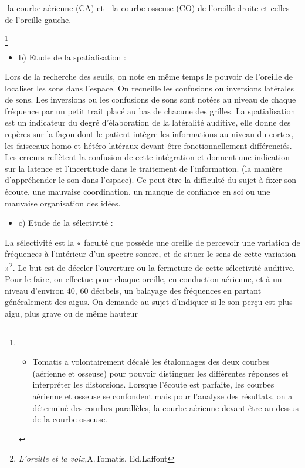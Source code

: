 -la courbe aérienne (CA) et - la courbe osseuse (CO) de l'oreille
droite et celles de l'oreille gauche.

\footnote{\begin{itemize}
\item Tomatis a volontairement décalé les étalonnages des deux courbes (aérienne
et osseuse) pour pouvoir distinguer les différentes réponses et interpréter
les distorsions. Lorsque l\textquoteright écoute est parfaite, les
courbes aérienne et osseuse se confondent mais pour l'analyse des
résultats, on a déterminé des courbes parallèles, la courbe aérienne
devant être au dessus de la courbe osseuse.
\end{itemize}
}
\begin{itemize}
\item b) Etude de la spatialisation :
\end{itemize}
Lors de la recherche des seuils, on note en même temps le pouvoir
de l'oreille de localiser les sons dans l'espace. On recueille les
confusions ou inversions latérales de sons. Les inversions ou les
confusions de sons sont notées au niveau de chaque fréquence par un
petit trait placé au bas de chacune des grilles. La spatialisation
est un indicateur du degré d'élaboration de la latéralité auditive,
elle donne des repères sur la façon dont le patient intègre les informations
au niveau du cortex, les faisceaux homo et hétéro-latéraux devant
être fonctionnellement différenciés. Les erreurs reflètent la confusion
de cette intégration et donnent une indication sur la latence et l'incertitude
dans le traitement de l'information. (la manière d'appréhender le
son dans l'espace). Ce peut être la difficulté du sujet à fixer son
écoute, une mauvaise coordination, un manque de confiance en soi ou
une mauvaise organisation des idées.
\begin{itemize}
\item c) Etude de la sélectivité : 
\end{itemize}
La sélectivité est la « faculté que possède une oreille de percevoir
une variation de fréquences à l'intérieur d'un spectre sonore, et
de situer le sens de cette variation »\footnote{\emph{L'oreille et la voix,}A.Tomatis, Ed.Laffont}.
Le but est de déceler l'ouverture ou la fermeture de cette sélectivité
auditive. Pour le faire, on effectue pour chaque oreille, en conduction
aérienne, et à un niveau d'environ 40, 60 décibels, un balayage des
fréquences en partant généralement des aigus. On demande au sujet
d'indiquer si le son perçu est plus aigu, plus grave ou de même hauteur
